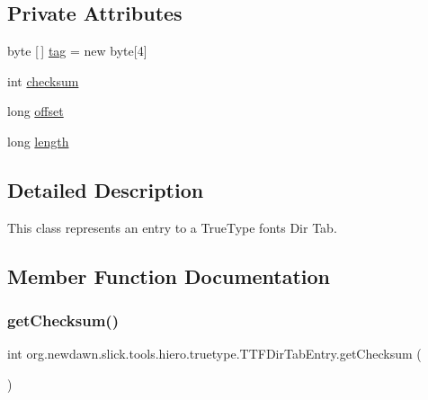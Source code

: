 \subsection*{Private Attributes}
\begin{DoxyCompactItemize}
\item 
byte \mbox{[}$\,$\mbox{]} \mbox{\hyperlink{classorg_1_1newdawn_1_1slick_1_1tools_1_1hiero_1_1truetype_1_1_t_t_f_dir_tab_entry_a77d2cd970e9bd38e996a73f6d46122d7}{tag}} = new byte\mbox{[}4\mbox{]}
\item 
int \mbox{\hyperlink{classorg_1_1newdawn_1_1slick_1_1tools_1_1hiero_1_1truetype_1_1_t_t_f_dir_tab_entry_af8c3a7b37c8fa7e2e9315f8e8bf61d6d}{checksum}}
\item 
long \mbox{\hyperlink{classorg_1_1newdawn_1_1slick_1_1tools_1_1hiero_1_1truetype_1_1_t_t_f_dir_tab_entry_a9bb77e4398e9b9a60789de3d96ac027c}{offset}}
\item 
long \mbox{\hyperlink{classorg_1_1newdawn_1_1slick_1_1tools_1_1hiero_1_1truetype_1_1_t_t_f_dir_tab_entry_a3b5ce79e290922eb792e0dd1ecd039c6}{length}}
\end{DoxyCompactItemize}


\subsection{Detailed Description}
This class represents an entry to a True\+Type font\textquotesingle{}s Dir Tab. 

\subsection{Member Function Documentation}
\mbox{\label{classorg_1_1newdawn_1_1slick_1_1tools_1_1hiero_1_1truetype_1_1_t_t_f_dir_tab_entry_afb20df096b7369d2a765b6af88b5d7e9}} 
\subsubsection{\texorpdfstring{get\+Checksum()}{getChecksum()}}
{\footnotesize\ttfamily int org.\+newdawn.\+slick.\+tools.\+hiero.\+truetype.\+T\+T\+F\+Dir\+Tab\+Entry.\+get\+Checksum (\begin{DoxyParamCaption}{ }\end{DoxyParamCaption})\hspace{0.3cm}{\ttfamily [inline]}}

